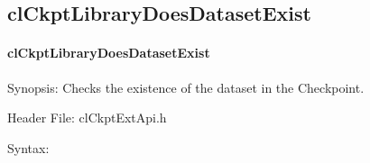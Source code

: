 \begin{flushleft}
\subsection{clCkptLibraryDoesDatasetExist}
\hypertarget{pageckpt210}{}\paragraph{cl\-Ckpt\-Library\-Does\-Dataset\-Exist}\label{pageckpt210}
\begin{Desc}
\item[Synopsis:]Checks the existence of the dataset in the Checkpoint.\end{Desc}
\begin{Desc}
\item[Header File:]clCkptExtApi.h\end{Desc}
\begin{Desc}
\item[Syntax:]


\end{Desc}
\end{flushleft}
